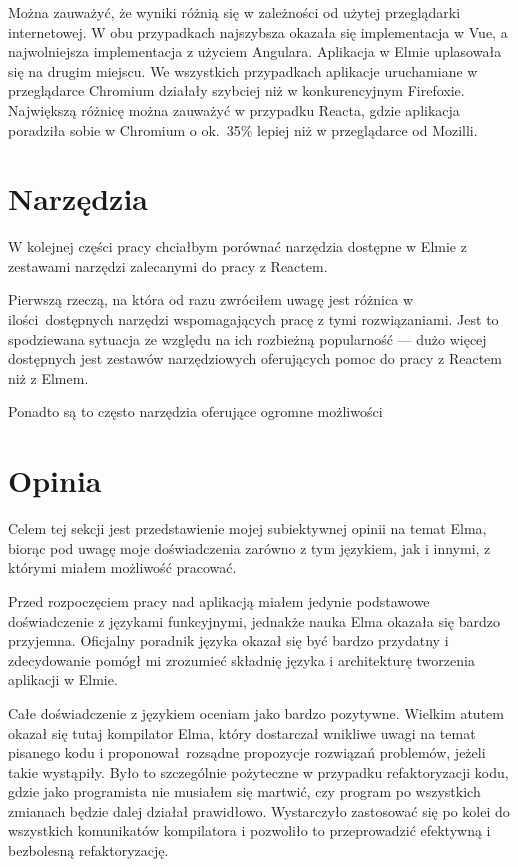 \documentclass[twoside,a4paper]{report}
\begin{document}
Można zauważyć, że wyniki różnią się w zależności od użytej przeglądarki internetowej.
W obu przypadkach najszybsza okazała się implementacja w Vue, a najwolniejsza implementacja z użyciem Angulara.
Aplikacja w Elmie uplasowała się na drugim miejscu.
We wszystkich przypadkach aplikacje uruchamiane w przeglądarce Chromium działały szybciej niż w konkurencyjnym Firefoxie.
Największą różnicę można zauważyć w przypadku Reacta, gdzie aplikacja poradziła sobie w Chromium o ok.~35\% lepiej niż w przeglądarce od Mozilli.

\section{Narzędzia}
W kolejnej części pracy chciałbym porównać narzędzia dostępne w Elmie z zestawami narzędzi zalecanymi do pracy z Reactem.

Pierwszą rzeczą, na która od razu zwróciłem uwagę jest różnica w ilości dostępnych narzędzi wspomagających pracę z tymi rozwiązaniami.
Jest to spodziewana sytuacja ze względu na ich rozbieżną popularność --- dużo więcej dostępnych jest zestawów narzędziowych oferujących pomoc do pracy z Reactem niż z Elmem.

Ponadto są to często narzędzia oferujące ogromne możliwości


\section{Opinia}
Celem tej sekcji jest przedstawienie mojej subiektywnej opinii na temat Elma, biorąc pod uwagę moje doświadczenia zarówno z tym językiem, jak i innymi, z którymi miałem możliwość pracować.

Przed rozpoczęciem pracy nad aplikacją miałem jedynie podstawowe doświadczenie z językami funkcyjnymi, jednakże nauka Elma okazała się bardzo przyjemna.
Oficjalny poradnik języka okazał się być bardzo przydatny i zdecydowanie pomógł mi zrozumieć składnię języka i architekturę tworzenia aplikacji w Elmie.

Całe doświadczenie z językiem oceniam jako bardzo pozytywne.
Wielkim atutem okazał się tutaj kompilator Elma, który dostarczał wnikliwe uwagi na temat pisanego kodu i proponował rozsądne propozycje rozwiązań problemów, jeżeli takie wystąpiły.
Było to szczególnie pożyteczne w przypadku refaktoryzacji kodu, gdzie jako programista nie musiałem się martwić, czy program po wszystkich zmianach będzie dalej działał prawidłowo.
Wystarczyło zastosować się po kolei do wszystkich komunikatów kompilatora i pozwoliło to przeprowadzić efektywną i bezbolesną refaktoryzację.
\end{document}
